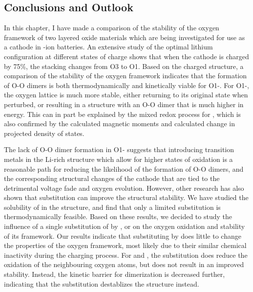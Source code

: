 \begin{refsection}
\section{Conclusions and Outlook} 

In this chapter, I have made a comparison of the stability of the oxygen 
framework of two layered oxide materials which are being investigated for use 
as a cathode in -ion batteries. An extensive study of the optimal 
lithium configuration at different states of charge shows that when the 
 cathode is charged by 75\%, the stacking changes from O3 to O1.
Based on the charged structure, a comparison of the stability of the oxygen 
framework indicates that the formation of O-O dimers is both thermodynamically 
and kinetically viable for O1-. For O1-, the 
oxygen lattice is much more stable, either returning to its original 
state when perturbed, or resulting in a structure with an O-O dimer that is 
much higher in energy. This can in part be explained by the mixed redox 
process for , which is also confirmed by the calculated magnetic 
moments and calculated change in projected density of states.

The lack of O-O dimer formation in O1- suggests that introducing 
transition metals in the Li-rich structure which allow for higher states of 
oxidation is a reasonable path for reducing the likelihood of the formation of 
O-O dimers, and the corresponding structural changes of the cathode that are 
tied to the detrimental voltage fade and oxygen evolution. However, other 
research has also shown that  substitution can improve the structural 
stability. We have studied the solubility of  in the 
 structure, and find that only a limited substitution 
is thermodynamically feasible. Based on these results, we decided to study 
the influence of a single substitution of  by ,  
or  on the oxygen oxidation and stability of its framework. Our results 
indicate that substituting  by  does little to change the 
properties of the oxygen framework, most likely due to their similar 
chemical inactivity during the charging process. For  and , the 
substitution does reduce the oxidation of the neighbouring oxygen atoms, 
but does not result in an improved stability. Instead, the kinetic barrier 
for dimerization is decreased further, indicating that the substitution 
destablizes the structure instead. 


\end{refsection}
